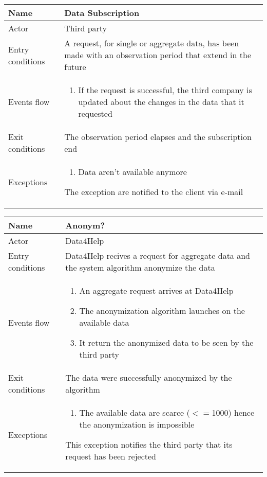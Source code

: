 \begin{table}[]
\begin{tabular}{|l|p{12cm}|}
\hline
Name             & Data Subscription \\ \hline
Actor            & Third party \\ \hline
Entry conditions & A request, for single or aggregate data, has been made with an observation period that extend in the future \\ \hline
Events flow      & \begin{enumerate}
\item If the request is successful, the third company is updated about the changes in the data that it requested
\end{enumerate} \\ \hline
Exit conditions  & The observation period elapses and the subscription end \\ \hline
Exceptions       & \begin{enumerate}
\item Data aren't available anymore
\end{enumerate} The exception are notified to the client via e-mail \\ \hline
\end{tabular}
\end{table}

\begin{table}[]
\begin{tabular}{|l|p{12cm}|}
\hline
Name             & Anonym? \\ \hline
Actor            & Data4Help \\ \hline
Entry conditions & Data4Help recives a request for aggregate data and the system algorithm anonymize the data \\ \hline
Events flow      & \begin{enumerate}
\item An aggregate request arrives at Data4Help
\item The anonymization algorithm launches on the available data
\item It return the anonymized data to be seen by the third party
\end{enumerate} \\ \hline
Exit conditions  & The data were successfully anonymized by the algorithm \\ \hline
Exceptions       & \begin{enumerate}
\item The available data are scarce ($<=$1000) hence the anonymization is impossible
\end{enumerate} This exception notifies the third party that its request has been rejected\\ \hline
\end{tabular}
\end{table}

